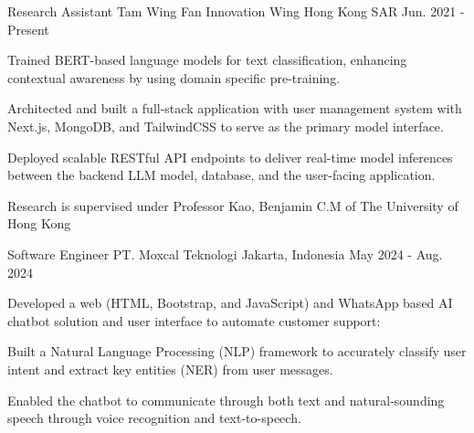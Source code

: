 

\begin{cventries}

  \cventry
    {Research Assistant} %
    {Tam Wing Fan Innovation Wing} %
    {Hong Kong SAR} %
    {Jun. 2021 - Present} %
    {
      \begin{cvitems} %
        \item {Trained BERT-based language models for text classification, enhancing contextual awareness by using domain specific pre-training.}
        \item {Architected and built a full-stack application with user management system with Next.js, MongoDB, and TailwindCSS to serve as the primary model interface.}
        \item {Deployed scalable RESTful API endpoints to deliver real-time model inferences between the backend LLM model, database, and the user-facing application.}
        \item {Research is supervised under Professor Kao, Benjamin C.M of The University of Hong Kong}
      \end{cvitems}
    }


  \cventry
    {Software Engineer} %
    {PT. Moxcal Teknologi} %
    {Jakarta, Indonesia} %
    {May 2024 - Aug. 2024} %
    {
      \begin{cvitems} %
        \item {Developed a web (HTML, Bootstrap, and JavaScript) and WhatsApp based AI chatbot solution and user interface to automate customer support:}
        \item {Built a Natural Language Processing (NLP) framework to accurately classify user intent and extract key entities (NER) from user messages.}
        \item {Enabled the chatbot to communicate through both text and natural-sounding speech through voice recognition and text-to-speech.}
      \end{cvitems}
    }
\end{cventries}
